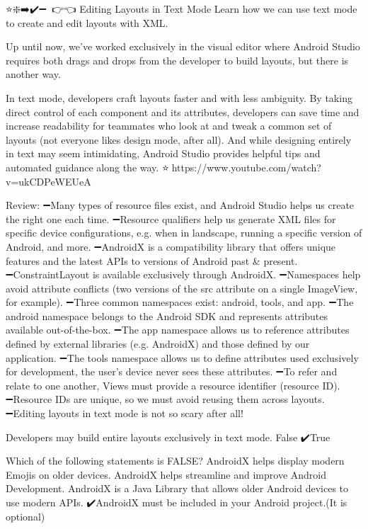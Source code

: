 ⭐❇️➡️✔️➖🔗💎👉👈
Editing Layouts in Text Mode
        Learn how we can use text mode to create and edit layouts with XML.

        Up until now, we’ve worked exclusively in the visual editor where Android Studio requires both drags and drops from the developer to build layouts, but there is another way.

        In text mode, developers craft layouts faster and with less ambiguity. By taking direct control of each component and its attributes, developers can save time and increase readability for teammates who look at and tweak a common set of layouts (not everyone likes design mode, after all). And while designing entirely in text may seem intimidating, Android Studio provides helpful tips and automated guidance along the way.
            ⭐🔗https://www.youtube.com/watch?v=ukCDPeWEUeA

        Review:
            ➖Many types of resource files exist, and Android Studio helps us create the right one each time.
            ➖Resource qualifiers help us generate XML files for specific device configurations, e.g. when in landscape, running a specific version of Android, and more.
            ➖AndroidX is a compatibility library that offers unique features and the latest APIs to versions of Android past & present.
            ➖ConstraintLayout is available exclusively through AndroidX.
            ➖Namespaces help avoid attribute conflicts (two versions of the src attribute on a single ImageView, for example).
            ➖Three common namespaces exist: android, tools, and app.
            ➖The android namespace belongs to the Android SDK and represents attributes available out-of-the-box.
            ➖The app namespace allows us to reference attributes defined by external libraries (e.g. AndroidX) and those defined by our application.
            ➖The tools namespace allows us to define attributes used exclusively for development, the user’s device never sees these attributes.
            ➖To refer and relate to one another, Views must provide a resource identifier (resource ID).
            ➖Resource IDs are unique, so we must avoid reusing them across layouts.
            ➖Editing layouts in text mode is not so scary after all!

        Developers may build entire layouts exclusively in text mode.
            False
            ✔️True

        Which of the following statements is FALSE?
            AndroidX helps display modern Emojis on older devices.
            AndroidX helps streamline and improve Android Development.
            AndroidX is a Java Library that allows older Android devices to use modern APIs.
            ✔️AndroidX must be included in your Android project.(It is optional)

